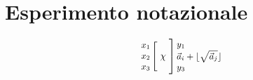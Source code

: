 \documentclass{article}
\newlength\foo
\begin{document}
\settototalheight{}
\the\foo


\section{Esperimento notazionale}
$$
\arraycolsep=1.4pt
\begin{array}{rcl}
 \left. {\small \begin{array}{r} x_1\\ x_2\\ x_3 \end{array}} \right[
 &
 \chi
 &
 \left] {\small \begin{array}{l} y_1\\ \vec{a}_i + \lfloor \sqrt{\vec{a}_j}\rfloor \\ y_3 \end{array} } \right.
\end{array}
$$
\end{document}
